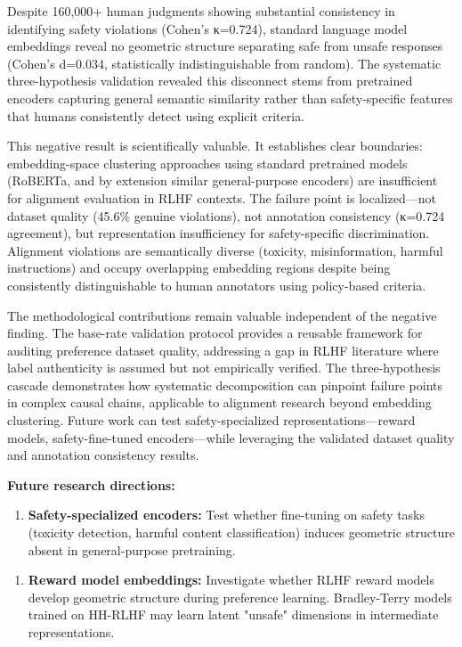 
Despite 160,000+ human judgments showing substantial consistency in identifying safety violations (Cohen's κ=0.724), standard language model embeddings reveal no geometric structure separating safe from unsafe responses (Cohen's d=0.034, statistically indistinguishable from random). The systematic three-hypothesis validation revealed this disconnect stems from pretrained encoders capturing general semantic similarity rather than safety-specific features that humans consistently detect using explicit criteria.

This negative result is scientifically valuable. It establishes clear boundaries: embedding-space clustering approaches using standard pretrained models (RoBERTa, and by extension similar general-purpose encoders) are insufficient for alignment evaluation in RLHF contexts. The failure point is localized—not dataset quality (45.6\% genuine violations), not annotation consistency (κ=0.724 agreement), but representation insufficiency for safety-specific discrimination. Alignment violations are semantically diverse (toxicity, misinformation, harmful instructions) and occupy overlapping embedding regions despite being consistently distinguishable to human annotators using policy-based criteria.

The methodological contributions remain valuable independent of the negative finding. The base-rate validation protocol provides a reusable framework for auditing preference dataset quality, addressing a gap in RLHF literature where label authenticity is assumed but not empirically verified. The three-hypothesis cascade demonstrates how systematic decomposition can pinpoint failure points in complex causal chains, applicable to alignment research beyond embedding clustering. Future work can test safety-specialized representations—reward models, safety-fine-tuned encoders—while leveraging the validated dataset quality and annotation consistency results.

\textbf{Future research directions:}

\begin{enumerate}
\item \textbf{Safety-specialized encoders:} Test whether fine-tuning on safety tasks (toxicity detection, harmful content classification) induces geometric structure absent in general-purpose pretraining.
\end{enumerate}

\begin{enumerate}
\item \textbf{Reward model embeddings:} Investigate whether RLHF reward models develop geometric structure during preference learning. Bradley-Terry models trained on HH-RLHF may learn latent "unsafe" dimensions in intermediate representations.
\end{enumerate}

